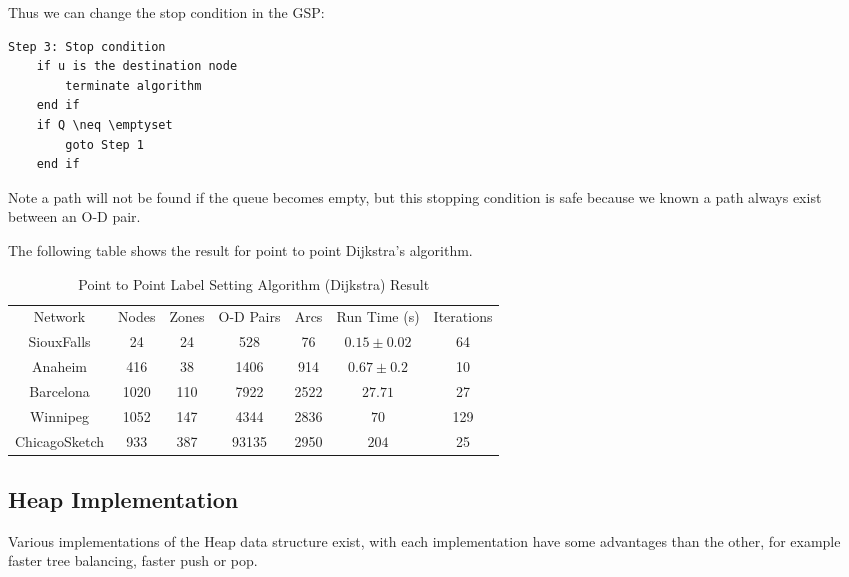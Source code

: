 Thus we can change the stop condition in the GSP:
\begin{verbatim}
Step 3: Stop condition
    if u is the destination node
        terminate algorithm
    end if
    if Q \neq \emptyset
        goto Step 1
    end if
\end{verbatim}
Note a path will not be found if the queue becomes empty,
but this stopping condition is safe because we known a path
always exist between an O-D pair.

The following table shows the result for point to point Dijkstra's algorithm.
\begin{table}[H]
    \centering
    \begin{tabular}{ccccccc}
        Network & Nodes & Zones & O-D Pairs & Arcs & Run Time (s) & Iterations \\
        SiouxFalls    & 24   & 24  & 528   & 76   & $ 0.15 \pm 0.02 $ & 64 \\
        Anaheim       & 416  & 38  & 1406  & 914  & $ 0.67 \pm 0.2  $ & 10 \\
        Barcelona     & 1020 & 110 & 7922  & 2522 & $ 27.71   $ & 27 \\
        Winnipeg      & 1052 & 147 & 4344  & 2836 & $ 70  $ & 129 \\
        ChicagoSketch & 933  & 387 & 93135 & 2950 & $ 204  $ & 25 
    \end{tabular}
    \caption{Point to Point Label Setting Algorithm (Dijkstra) Result}
\end{table}

\subsection{Heap Implementation}
Various implementations of the Heap data structure exist,
with each implementation have some advantages than the other,
for example faster tree balancing, faster push or pop.

